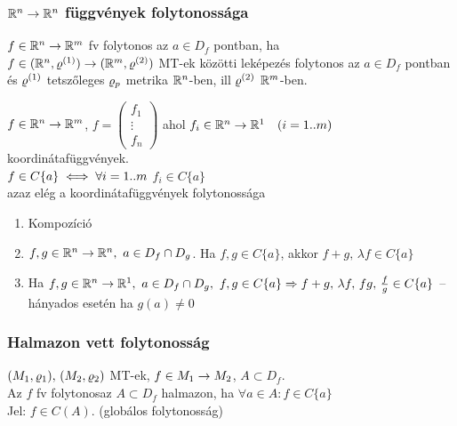 \subsubsection{$\mathbb{R}^n\to \mathbb{R}^n$ függvények folytonossága}
\begin{de}
  $f\in \mathbb{R}^n\to \mathbb{R}^m$ fv folytonos az $a\in D_f$ pontban, ha\\ $f\in
  (\mathbb{R}^n,\varrho^{(1)})\to(\mathbb{R}^m,\varrho^{(2)}) $ MT-ek közötti leképezés
  folytonos az $a\in D_f$ pontban és $\varrho^{(1)}$ tetszőleges $\varrho_p$
  metrika $\mathbb{R}^n$-ben, ill $\varrho^{(2)}$ $\mathbb{R}^m$-ben.
\end{de}
\begin{te}
  $f\in \mathbb{R}^n\to \mathbb{R}^m$, $f = \left(
  \begin{array}{c}
    f_1\\\vdots\\f_n\end{array}\right)$  ahol $f_i\in
    \mathbb{R}^n\to\mathbb{R}^1\quad (i=1..m)$ koordinátafüggvények.\\
    $f\in C\{a\} \iff \forall i=1..m$ $f_i\in C\{a\}$\\
    azaz elég a koordinátafüggvények folytonossága
\end{te}
\begin{te}[Műveletek]
  \begin{enumerate}
  \item Kompozíció
  \item $f,g\in \mathbb{R}^n\to\mathbb{R}^n,\ a\in D_f\cap D_g$. Ha $f,g\in C\{a\}$,
    akkor $f+g,\, \lambda f\in C\{a\}$
  \item Ha $f,g\in \mathbb{R}^n\to\mathbb{R}^1,\ a\in D_f\cap D_g,\ f,g\in
    C\{a\}\Rightarrow f+g,\,\lambda f,\, fg,\, \frac f g\in C\{a\}$ -- hányados
    esetén ha $g(a) \neq 0$
  \end{enumerate}
\end{te}


\subsubsection{Halmazon vett folytonosság}
\begin{de}
  $(M_1,\varrho_1),\,(M_2,\varrho_2)$ MT-ek, $f\in M_1\to M_2$, $A\subset
  D_f$.\\
  Az $f$ fv folytonosaz $A\subset D_f$ halmazon, ha $\forall a\in
  A\colon f\in C\{a\}$\\
  Jel: $f\in C(A)$. (globálos folytonosság)
\end{de}

